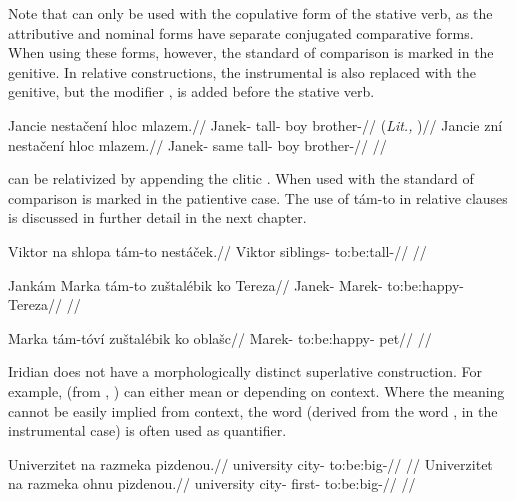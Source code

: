 Note that  can only be used with the copulative form of the stative verb, as the attributive and nominal forms have separate conjugated comparative forms. When using these forms, however, the standard of comparison is marked in the genitive. In relative constructions, the instrumental is also replaced with the genitive, but the modifier ,  is added before the stative verb.

\pex
\a
\begingl
\gla Jancie nesta\v{c}en\'i hloc mlazem.//
\glb Janek- tall- boy brother-//
\glft {} (\emph{Lit.,} )//
\endgl
\a
\begingl
\gla Jancie zn\'i nesta\v{c}en\'i hloc mlazem.//
\glb Janek- same tall- boy brother-//
\glft {}//
\endgl
\xe

 can be relativized by appending the clitic . When used with  the standard of comparison is marked in the patientive case. The use of t\'am-to in relative clauses is discussed in further detail in the next chapter.

\ex
\begingl
\gla Viktor na shlopa t\'am-to nest\'a\v{c}ek.//
\glb Viktor  siblings-  to:be:tall-//
\glft {}//
\endgl
\xe

\ex
\begingl
\gla Jank\'am Marka t\'am-to zu\v{s}tal\'ebik ko Tereza//
\glb Janek- Marek-  to:be:happy-  Tereza//
\glft {}//
\endgl
\xe

\ex
\begingl
\gla Marka t\'am-t\'ov\'i zu\v{s}tal\'ebik ko obla\v{s}c//
\glb Marek-  to:be:happy-  pet//
\glft {}//
\endgl
\xe

Iridian does not have a morphologically distinct superlative construction. For example,  (from , ) can either mean  or  depending on context. Where the meaning cannot be easily implied from context, the word  (derived from the word ,  in the instrumental case) is often used as quantifier.

\pex
\a
\begingl
\gla Univerzitet na razmeka pizdenou.//
\glb university  city- to:be:big-//
\glft {}//
\endgl
\a
\begingl
\gla Univerzitet na razmeka ohnu pizdenou.//
\glb university  city- first- to:be:big-//
\glft {}//
\endgl
\xe

